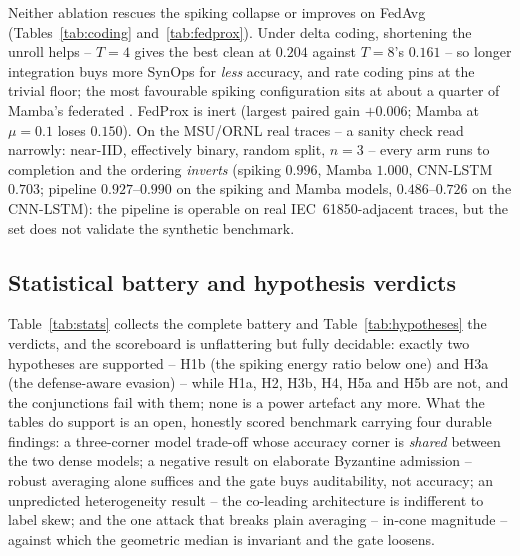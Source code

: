 Neither ablation rescues the spiking collapse or improves on FedAvg
(Tables~\ref{tab:coding} and~\ref{tab:fedprox}). Under delta coding,
shortening the unroll helps -- $T=4$ gives the best clean \macroF{} at
$0.204$ against $T=8$'s $0.161$ -- so longer integration buys more
SynOps for \emph{less} accuracy, and rate coding pins at the trivial
floor; the most favourable spiking configuration sits at about a quarter
of Mamba's federated \macroF{}. FedProx is inert (largest paired gain
$+0.006$; Mamba at $\mu=0.1$ loses $0.150$). On the MSU/ORNL real
traces -- a sanity check read narrowly: near-IID, effectively binary,
random split, $n=3$ -- every arm runs to completion and the ordering
\emph{inverts} (spiking $0.996$, Mamba $1.000$, CNN-LSTM $0.703$;
pipeline $0.927$--$0.990$ on the spiking and Mamba models,
$0.486$--$0.726$ on the CNN-LSTM): the pipeline is operable on real
IEC~61850-adjacent traces, but the set does not validate the synthetic
benchmark.

\subsection{Statistical battery and hypothesis verdicts}
\label{sec:res-stats}

Table~\ref{tab:stats} collects the complete battery and
Table~\ref{tab:hypotheses} the verdicts, and the scoreboard is
unflattering but fully decidable: exactly two hypotheses are supported
-- H1b (the spiking energy ratio below one) and H3a (the defense-aware
evasion) -- while H1a, H2, H3b, H4, H5a and H5b are not, and the
conjunctions fail with them; none is a power artefact any more. What the
tables do support is an open, honestly scored benchmark carrying four
durable findings: a three-corner model trade-off whose accuracy corner
is \emph{shared} between the two dense models; a negative result on
elaborate Byzantine admission -- robust averaging alone suffices and the
gate buys auditability, not accuracy; an unpredicted heterogeneity
result -- the co-leading architecture is indifferent to label skew; and
the one attack that breaks plain averaging -- in-cone magnitude --
against which the geometric median is invariant and the gate loosens.
